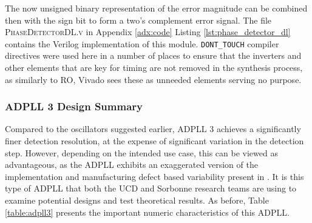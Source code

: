 The now unsigned binary representation of the error magnitude can be combined then with the sign bit to form a two's complement error signal. The file \textsc{PhaseDetectorDL.v} in Appendix \ref{adx:code} Listing \ref{lst:phase_detector_dl} contains the Verilog implementation of this module. \texttt{DONT\_TOUCH} compiler directives were used here in a number of places to ensure that the inverters and other elements that are key for timing are not removed in the synthesis process, as similarly to \ac{RO}, Vivado sees these as unneeded elements serving no purpose.

\subsubsection{\acs{ADPLL} 3 Design Summary}
Compared to the oscillators suggested earlier, \ac{ADPLL} 3 achieves a significantly finer detection resolution, at the expense of significant variation in the detection step. However, depending on the intended use case, this can be viewed as advantageous, as the \ac{ADPLL} exhibits an exaggerated version of the implementation and manufacturing defect based variability present in . It is this type of \ac{ADPLL} that both the \acs{UCD} and Sorbonne research teams are using to examine potential designs and test theoretical results. As before, Table \ref{table:adpll3} presents the important numeric characteristics of this \ac{ADPLL}.


